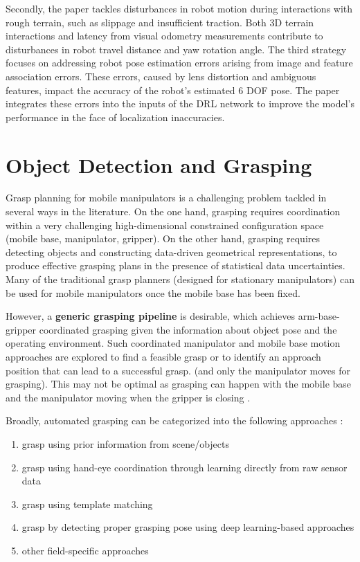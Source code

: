 Secondly, the paper tackles disturbances in robot motion during interactions with rough
terrain, such as slippage and insufficient traction. Both 3D terrain interactions and
latency from visual odometry measurements contribute to disturbances in robot travel distance
and yaw rotation angle. The third strategy focuses on addressing robot pose estimation errors
arising from image and feature association errors. These errors, caused by lens distortion
and ambiguous features, impact the accuracy of the robot's estimated 6 DOF pose.
The paper integrates these errors into the inputs of the DRL network to improve the
model's performance in the face of localization inaccuracies.



\section{Object Detection and Grasping}

Grasp planning for mobile manipulators is a challenging problem tackled in several ways in the literature.
On the one hand, grasping requires coordination within a very challenging high-dimensional constrained
configuration space (mobile base, manipulator, gripper).
On the other hand, grasping requires detecting objects and constructing data-driven geometrical representations,
to produce effective grasping plans in the presence of statistical data uncertainties.
Many of the traditional grasp planners (designed for stationary
manipulators) can be used for mobile manipulators once the mobile base has been fixed.

However, a \textbf{generic grasping pipeline} is desirable, which achieves arm-base-gripper
coordinated grasping given the information about object pose and
the operating environment. Such coordinated manipulator and mobile base motion approaches are explored
to find a feasible grasp or to identify an approach position that can lead to a successful grasp.
(and only the manipulator moves for grasping). This may not be optimal as grasping can happen
with the mobile base and the manipulator moving when the gripper is closing \cite{thakar2023survey}.

Broadly, automated grasping can be categorized into the following approaches
\cite{asadi2019construction}:

\begin{enumerate}
	\item grasp using prior information from scene/objects
	\item grasp using hand-eye coordination through learning directly from raw sensor data
	\item grasp using template matching
	\item grasp by detecting proper grasping pose using deep learning-based approaches
	\item other field-specific approaches
\end{enumerate}


